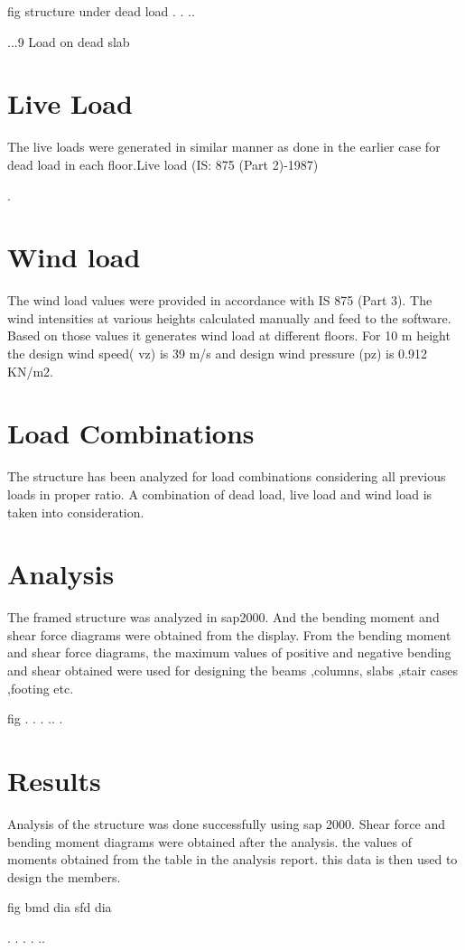 fig
structure under dead load
.
.
..

...9 Load on dead slab

\section{Live Load}
The live loads were generated in similar manner as done in the earlier case  for dead load in each floor.Live load (IS: 875 (Part 2)-1987)


.
\section{Wind load}
	The wind load values were provided in accordance with IS 875 (Part 3). The wind intensities at various heights calculated manually and feed to the software. Based on those values it generates wind load at different floors. For 10 m height the design wind speed( vz) is 39 m/s and design wind pressure (pz) is 0.912 KN/m2.
\section{Load Combinations}
 	The structure has been analyzed for load combinations considering all previous loads in proper ratio. A combination of dead load, live load and wind load is taken into consideration.
\section{Analysis}
	The framed structure was analyzed in sap2000. And the bending moment  and shear force diagrams were obtained from the display. From the bending moment and shear force diagrams, the maximum values of positive and negative bending and shear obtained were used for designing the beams ,columns, slabs ,stair cases ,footing etc.

fig
.
.
.
..
.
\section{Results}
	Analysis of the structure was done successfully using sap 2000. Shear force and bending moment diagrams were obtained after  the analysis. the values of moments obtained from  the table in the analysis report. this data is then used to design the members.

fig
bmd dia
sfd dia

.
.
.
.
..
